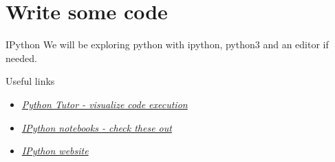 \documentclass{bredelebeamer}
\begin{document}
\section{Write some code}

\begin{frame}{IPython}
We will be exploring python with ipython, python3 and an editor if needed.\\

  \begin{block}{Useful links}
    \begin{itemize}
      \item \href{http://www.pythontutor.com/visualize.html\#mode=edit}{\emph{Python Tutor - visualize code execution}}
      \item \href{http://ipython.org/notebook.html}{\emph{IPython notebooks - check these out}}
      \item \href{http://ipython.org/}{\emph{IPython website}}
    \end{itemize}
  \end{block}
\end{frame}
\end{document}
